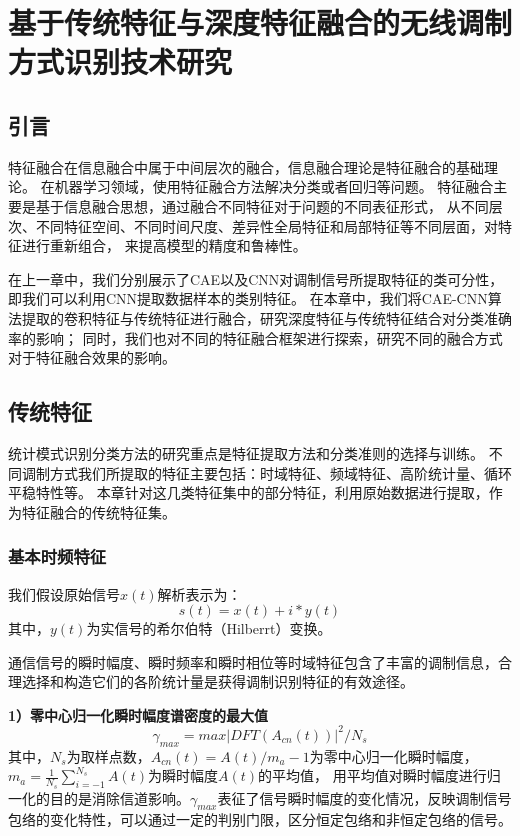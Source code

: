 \chapter{基于传统特征与深度特征融合的无线调制方式识别技术研究}
\section{引言}
特征融合在信息融合中属于中间层次的融合，信息融合理论是特征融合的基础理论。
在机器学习领域，使用特征融合方法解决分类或者回归等问题。
特征融合主要是基于信息融合思想，通过融合不同特征对于问题的不同表征形式，
从不同层次、不同特征空间、不同时间尺度、差异性全局特征和局部特征等不同层面，对特征进行重新组合，
来提高模型的精度和鲁棒性。\par

在上一章中，我们分别展示了CAE以及CNN对调制信号所提取特征的类可分性，即我们可以利用CNN提取数据样本的类别特征。
在本章中，我们将CAE-CNN算法提取的卷积特征与传统特征进行融合，研究深度特征与传统特征结合对分类准确率的影响；
同时，我们也对不同的特征融合框架进行探索，研究不同的融合方式对于特征融合效果的影响。\par

\section{传统特征}

统计模式识别分类方法的研究重点是特征提取方法和分类准则的选择与训练。
不同调制方式我们所提取的特征主要包括：时域特征、频域特征、高阶统计量、循环平稳特性等。
本章针对这几类特征集中的部分特征，利用原始数据进行提取，作为特征融合的传统特征集。\par

\subsection{基本时频特征}

我们假设原始信号$x(t)$解析表示为：
\begin{equation}
s(t)=x(t)+i*y(t)
\end{equation}
其中，$y(t)$为实信号的希尔伯特（Hilberrt）变换。\par

通信信号的瞬时幅度、瞬时频率和瞬时相位等时域特征包含了丰富的调制信息，合理选择和构造它们的各阶统计量是获得调制识别特征的有效途径。\par

\textbf{1）零中心归一化瞬时幅度谱密度的最大值}
\begin{equation}
\gamma_{max}=max|DFT(A_{cn}(t))|^{2}/N_s
\end{equation}
其中，$N_s$为取样点数，$A_{cn}(t)=A(t)/m_a-1$为零中心归一化瞬时幅度，
$m_a=\frac{1}{N_s}\sum_{i=-1}^{N_s}A(t)$为瞬时幅度$A(t)$的平均值，
用平均值对瞬时幅度进行归一化的目的是消除信道影响。$\gamma_{max}$表征了信号瞬时幅度的变化情况，反映调制信号包络的变化特性，可以通过一定的判别门限，区分恒定包络和非恒定包络的信号。


